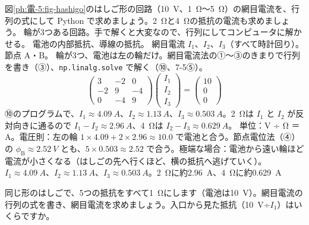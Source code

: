 \begin{phreidai}
\label{ph:電-5:ex5}図\ref{ph:電-5:fig-hashigo}のはしご形の回路（\qty{10}{V}、\qty{1}{\ohm}〜\qty{5}{\ohm}）の網目電流を、行列の式にして Python で求めましょう。\qty{2}{\ohm}と\qty{4}{\ohm}の抵抗の電流も求めましょう。
\phbamen
輪が3つある回路。手で解くと大変なので、行列にしてコンピュータに解かせる。
\phmushi
電池の内部抵抗、導線の抵抗。
\phzu
網目電流 $I_1$、$I_2$、$I_3$（すべて時計回り）。節点 A・B。
\phriyu
輪が3つ、電池は左の輪だけ。網目電流法の①〜③のきまりで行列を書き（③）、\texttt{np.linalg.solve} で解く（⑩、7-5⑤）。
\phtateru
\[ \begin{pmatrix}3&-2&0\\-2&9&-4\\0&-4&9\end{pmatrix}\begin{pmatrix}I_1\\I_2\\I_3\end{pmatrix}=\begin{pmatrix}10\\0\\0\end{pmatrix} \]
\phtoku
⑩のプログラムで、$I_1\approx\qty{4.09}{A}$、$I_2\approx\qty{1.13}{A}$、$I_3\approx\qty{0.503}{A}$。\qty{2}{\ohm}は $I_1$ と $I_2$ が反対向きに通るので $I_1-I_2\approx\qty{2.96}{A}$、\qty{4}{\ohm}は $I_2-I_3\approx\qty{0.629}{A}$。
\phtashikame
単位：V ÷ Ω ＝ A。電圧則：左の輪 $1\times4.09+2\times2.96\approx10.0$ で電池と合う。節点電位法（④）の $\phi_{\mathrm B}\approx\qty{2.52}{V}$ とも、$5\times0.503\approx2.52$ で合う。極端な場合：電池から遠い輪ほど電流が小さくなる（はしごの先へ行くほど、横の抵抗へ逃げていく）。
\kotae $I_1\approx\qty{4.09}{A}$、$I_2\approx\qty{1.13}{A}$、$I_3\approx\qty{0.503}{A}$。\qty{2}{\ohm}に約\qty{2.96}{A}、\qty{4}{\ohm}に約\qty{0.629}{A}
\end{phreidai}
\begin{jibun}
同じ形のはしごで、5つの抵抗をすべて\qty{1}{\ohm}にします（電池は\qty{10}{V}）。網目電流の行列の式を書き、網目電流を求めましょう。入口から見た抵抗（\qty{10}{V}÷$I_1$）はいくらですか。
\end{jibun}

